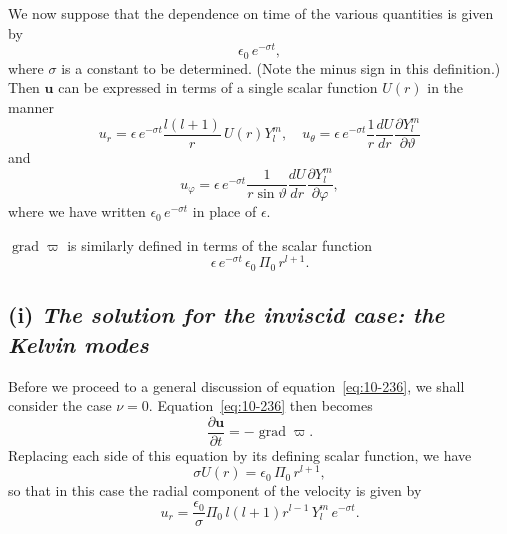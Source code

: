 We now suppose that the dependence on time of the various quantities is given by
\begin{equation}
\label{eq:10-245}
\epsilon_0\,e^{-\sigma t},
\end{equation}
where $\sigma$ is a constant to be determined. (Note the minus sign in this definition.) Then $\mathbf{u}$ can be expressed in terms of a single scalar function $U(r)$ in the manner
\begin{equation}
\label{eq:10-246}
u_r = \epsilon\,e^{-\sigma t}\frac{l(l+1)}{r}\,U(r)Y_l^m, \quad u_\theta = \epsilon\,e^{-\sigma t}\frac{1}{r}\frac{dU}{dr}\frac{\partial Y_l^m}{\partial\vartheta}
\end{equation}
and
\begin{equation}
u_\varphi = \epsilon\,e^{-\sigma t}\frac{1}{r\sin\vartheta}\frac{dU}{dr}\frac{\partial Y_l^m}{\partial\varphi},
\end{equation}
where we have written $\epsilon_0\,e^{-\sigma t}$ in place of $\epsilon$.

$\operatorname{grad}\varpi$ is similarly defined in terms of the scalar function
\begin{equation}
\label{eq:10-247}
\epsilon\,e^{-\sigma t}\,\epsilon_0\,\Pi_0\,r^{l+1}.
\end{equation}

\subsection*{(i) \textit{The solution for the inviscid case: the Kelvin modes}}

Before we proceed to a general discussion of equation~\eqref{eq:10-236}, we shall consider the case $\nu = 0$. Equation~\eqref{eq:10-236} then becomes
\begin{equation}
\label{eq:10-248}
\frac{\partial\mathbf{u}}{\partial t} = -\operatorname{grad}\varpi.
\end{equation}
Replacing each side of this equation by its defining scalar function, we have
\begin{equation}
\label{eq:10-249}
\sigma U(r) = \epsilon_0\,\Pi_0\,r^{l+1},
\end{equation}
so that in this case the radial component of the velocity is given by
\begin{equation}
\label{eq:10-250}
u_r = \frac{\epsilon_0}{\sigma}\Pi_0\,l(l+1)r^{l-1}\,Y_l^m\,e^{-\sigma t}.
\end{equation}


